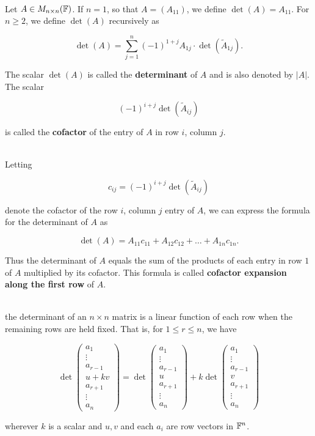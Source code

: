 \begin{definition}
	\hfill\\
	Let $A \in M_{n \times n}(\mathbb{F})$. If $n =1$, so that $A = (A_{11})$, we define $\det(A) = A_{11}$. For $n \geq 2$, we define $\det(A)$ recursively as
	
	\[\det(A) = \sum_{j=1}^{n}(-1)^{1+j}A_{1j}\cdot\det(\tilde{A}_{1j}).\]
	
	The scalar $\det(A)$ is called the \textbf{determinant} of $A$ and is also denoted by $|A|$. The scalar
	
	\[(-1)^{i+j}\det(\tilde{A}_{ij})\]
	
	is called the \textbf{cofactor} of the entry of $A$ in row $i$, column $j$.
\end{definition}

\begin{definition}
	\hfill\\
	Letting
	
	\[c_{ij} = (-1)^{i+j}\det(\tilde{A}_{ij})\]
	
	denote the cofactor of the row $i$, column $j$ entry of $A$, we can express the formula for the determinant of $A$ as
	
	\[\det(A) = A_{11}c_{11} + A_{12}c_{12}+\dots+A_{1n}c_{1n}.\]
	
	Thus the determinant of $A$ equals the sum of the products of each entry in row $1$ of $A$ multiplied by its cofactor. This formula is called \textbf{cofactor expansion along the first row} of $A$.
\end{definition}

\begin{theorem}
	\hfill\\
	the determinant of an $n \times n$ matrix is a linear function of each row when the remaining rows are held fixed. That is, for $1 \leq r \leq n$, we have
	
	\[\det\begin{pmatrix}
		a_1 \\ \vdots \\ a_{r-1} \\ u+kv \\ a_{r+1} \\ \vdots \\ a_n
	\end{pmatrix}=\det\begin{pmatrix}
	a_1 \\ \vdots \\ a_{r-1} \\ u \\ a_{r+1} \\ \vdots \\ a_n
	\end{pmatrix} + k\det\begin{pmatrix}
	a_1 \\ \vdots \\ a_{r-1} \\ v \\ a_{r+1} \\ \vdots \\ a_n
	\end{pmatrix}\]
	
	wherever $k$ is a scalar and $u, v$ and each $a_i$ are row vectors in $\mathbb{F}^n$.
\end{theorem}

